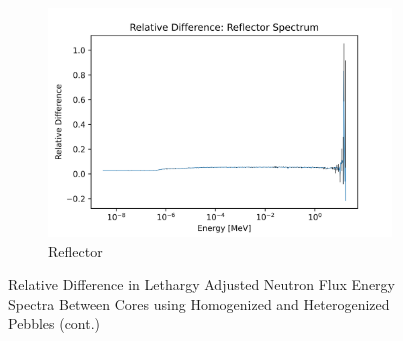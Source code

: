 \begin{figure}[H]\ContinuedFloat
\centering

\begin{subfigure}{0.95\textwidth}
  \includegraphics[width=0.95\linewidth]{figures/reldiff_reflec_spec}
  \caption{Reflector}
  \label{fig:diff-reflec}
\end{subfigure}%

\caption{Relative Difference in Lethargy Adjusted Neutron Flux Energy Spectra Between Cores using Homogenized and Heterogenized Pebbles (cont.)}
\label{fig:diff-spec}
\end{figure}